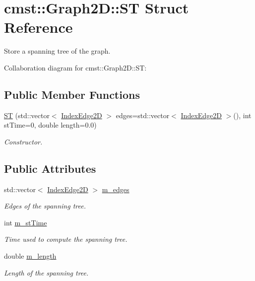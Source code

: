\hypertarget{structcmst_1_1_graph2_d_1_1_s_t}{}\section{cmst::Graph2D::ST Struct Reference}
\label{structcmst_1_1_graph2_d_1_1_s_t}


Store a spanning tree of the graph.  




Collaboration diagram for cmst::Graph2D::ST:
\subsection*{Public Member Functions}
\begin{DoxyCompactItemize}
\item 
\hyperlink{structcmst_1_1_graph2_d_1_1_s_t_a1664ad2ca7aeff224949d7ca06e5d8e1}{ST} (std::vector$<$ \hyperlink{classcmst_1_1_index_edge2_d}{IndexEdge2D} $>$ edges=std::vector$<$ \hyperlink{classcmst_1_1_index_edge2_d}{IndexEdge2D} $>$(), int stTime=0, double length=0.0)
\begin{DoxyCompactList}\small\item\em Constructor. \end{DoxyCompactList}\end{DoxyCompactItemize}
\subsection*{Public Attributes}
\begin{DoxyCompactItemize}
\item 
std::vector$<$ \hyperlink{classcmst_1_1_index_edge2_d}{IndexEdge2D} $>$ \hyperlink{structcmst_1_1_graph2_d_1_1_s_t_a629248d1f9b4b5bc583a7813ae852095}{m\_edges}
\begin{DoxyCompactList}\small\item\em Edges of the spanning tree. \end{DoxyCompactList}\item 
int \hyperlink{structcmst_1_1_graph2_d_1_1_s_t_ad3201db988690542cc7ef7ddff9525cc}{m\_stTime}
\begin{DoxyCompactList}\small\item\em Time used to compute the spanning tree. \end{DoxyCompactList}\item 
double \hyperlink{structcmst_1_1_graph2_d_1_1_s_t_a954af452de884ab5a96ef6a396b9d531}{m\_length}
\begin{DoxyCompactList}\small\item\em Length of the spanning tree. \end{DoxyCompactList}\end{DoxyCompactItemize}


